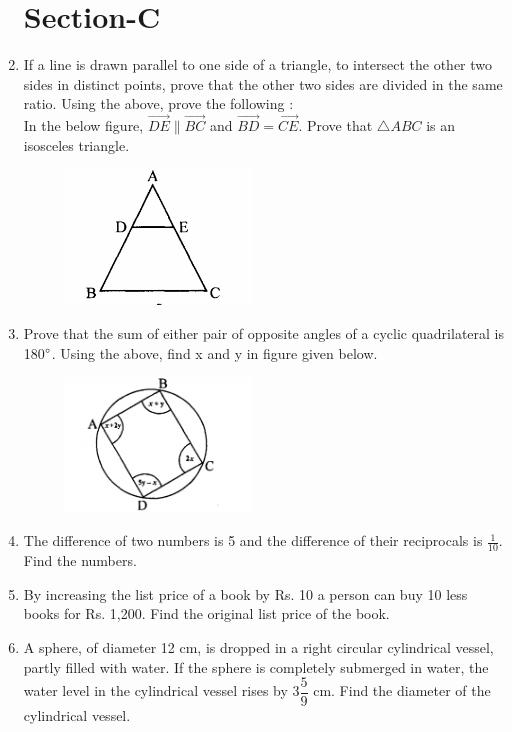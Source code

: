 \documentclass[journal,12pt,twocolumn]{IEEEtran}
\begin{document}
\begin{enumerate}
 \section{Section-C}
 \item If a line is drawn parallel to one side of a triangle, to intersect the other two sides in distinct points, prove that the other two sides are divided in the same ratio. Using the above, prove the following :\\ In the below figure, $\vec{DE} \| \vec{BC}$ and $\vec{BD}=\vec{CE}$. Prove that $\triangle{ABC}$ is an isosceles triangle.
 \begin{figure}[h!]
    \centering
    \includegraphics[width=5cm]{8.png}
 \end{figure}
 \medskip
 \item Prove that the sum of either pair of opposite angles of a cyclic quadrilateral is 180$\degree$. Using the above, find x and y in figure given below.
 \begin{figure}[h!]
    \centering
    \includegraphics[width=5cm]{9.png}
 \end{figure}
 \medskip
 \item The difference of two numbers is 5 and the difference of their reciprocals is $\displaystyle\frac{1}{10}$. Find the numbers.
 \medskip
\item  By increasing the list price of a book by Rs. 10 a person can buy 10 less books for Rs. 1,200. Find the original list price of the book.
\medskip
\item A sphere, of diameter 12 cm, is dropped in a right circular cylindrical vessel, partly filled with water. If the sphere is completely submerged in water, the water level in the cylindrical vessel rises by {3}$\dfrac{5}{9}$ cm. Find the diameter of the cylindrical vessel.

\end{enumerate}
\end{document}
